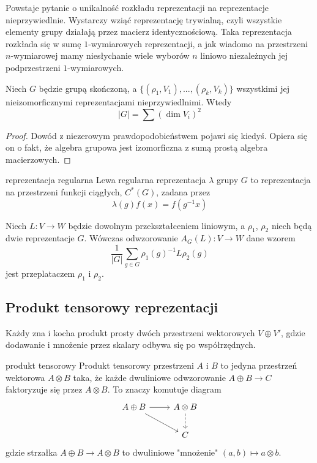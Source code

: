 Powstaje pytanie o unikalność rozkładu reprezentacji na reprezentacje nieprzywiedlnie. Wystarczy wziąć reprezentację trywialną, czyli wszystkie elementy grupy działają przez macierz identycznościową. Taka reprezentacja rozkłada się w sumę $1$-wymiarowych reprezentacji, a jak wiadomo na przestrzeni $n$-wymiarowej mamy niesłychanie wiele wyborów $n$ liniowo niezależnych jej podprzestrzeni $1$-wymiarowych.

\begin{theorem}{}{}
  Niech $G$ będzie grupą skończoną, a $\{(\rho_1, V_1),...,(\rho_k, V_k)\}$ wszystkimi jej nieizomorficznymi reprezentacjami nieprzywiedlnimi. Wtedy
  $$|G|=\sum (\dim V_i)^2$$
\end{theorem}

\begin{proof}
  Dowód z niezerowym prawdopodobieństwem pojawi się kiedyś. Opiera się on o fakt, że algebra grupowa jest izomorficzna z sumą prostą algebra macierzowych.
\end{proof}

\begin{definition}{reprezentacja regularna}{}
  Lewa regularna reprezentacja $\lambda$ grupy $G$ to reprezentacja na przestrzeni funkcji ciągłych, $C^*(G)$, zadana przez
  $$\lambda(g)f(x)=f(g^{-1}x)$$
\end{definition}

\begin{lemma}{}{}
  Niech $L:V\to W$ będzie dowolnym przekształceniem liniowym, a $\rho_1$, $\rho_2$ niech będą dwie reprezentacje $G$. Wówczas odwzorowanie $A_G(L):V\to W$ dane wzorem
  $$\frac{1}{|G|}\sum_{g\in G}\rho_1(g)^{-1}L\rho_2(g)$$
  jest przeplataczem $\rho_1$ i $\rho_2$.
\end{lemma}

\subsection{Produkt tensorowy reprezentacji}

Każdy zna i kocha produkt prosty dwóch przestrzeni wektorowych $V\oplus V'$, gdzie dodawanie i mnożenie przez skalary odbywa się po współrzędnych. 

\begin{definition}{produkt tensorowy}{}
  Produkt tensorowy przestrzeni $A$ i $B$ to jedyna przestrzeń wektorowa $A\otimes B$ taka, że każde dwuliniowe odwzorowanie $A\oplus B\to C$ faktoryzuje się przez $A\otimes B$. To znaczy komutuje diagram
  $$\begin{tikzcd}
    A\oplus B\arrow[r]\arrow[dr] & A\otimes B \arrow[d, dashed]\\ 
                                 & C
  \end{tikzcd}$$
  gdzie strzałka $A\oplus B\to A\otimes B$ to dwuliniowe "mnożenie" $(a,b)\mapsto a\otimes b$.
\end{definition}


